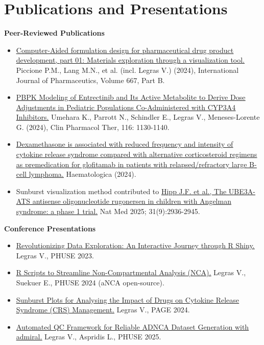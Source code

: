 \documentclass[10pt,a4paper]{article}
\newcommand{\link}[2]{\href{#1}{\textcolor{linkblue}{\uline{#2}}}}
\newcommand{\skillhead}[1]{\vspace{3pt}\noindent\textbf{\color{accent}#1}\par\vspace{1pt}}
\begin{document}
\section{Publications and Presentations}
{\sloppy
\skillhead{Peer-Reviewed Publications}
\begin{itemize}
  \item \link{https://www.sciencedirect.com/science/article/pii/S0378517324011256?via\%3Dihub}{Computer-Aided
        formulation design for pharmaceutical drug product development, part 01:
        Materials exploration through a visualization tool.} Piccione P.M.,
        Lang M.N., et al. (incl. Legras V.) (2024), International Journal of
        Pharmaceutics, Volume 667, Part B.
  \item \link{https://ascpt.onlinelibrary.wiley.com/doi/10.1002/cpt.3386}{PBPK
        Modeling of Entrectinib and Its Active Metabolite to Derive Dose
        Adjustments in Pediatric Populations Co-\allowbreak Administered with
        CYP3A4 Inhibitors.} Umehara K., Parrott N., Schindler E., Legras V.,
        Meneses-Lorente G. (2024), Clin Pharmacol Ther, 116: 1130-1140.
  \item \link{https://haematologica.org/article/view/11850}{Dexamethasone is
        associated with reduced frequency and intensity of cytokine release
        syndrome compared with alternative corticosteroid regimens as
        premedication for glofitamab in patients with relapsed/\allowbreak refractory
        large B-cell lymphoma.} Haematologica (2024).
  \item Sunburst visualization method contributed to \link{https://pubmed.ncbi.nlm.nih.gov/40646322/}{Hipp
        J.F. et al., The UBE3A-ATS antisense oligonucleotide rugonersen in
        children with Angelman syndrome: a phase 1 trial.} Nat Med 2025;
        31(9):2936-2945.
\end{itemize}
\vspace{3pt}
\skillhead{Conference Presentations}
\begin{itemize}
  \item \link{https://phuse.s3.eu-central-1.amazonaws.com/Archive/2023/Connect/EU/Birmingham/PRE_DV02.pdf}{Revolutionizing
        Data Exploration: An Interactive Journey through R Shiny.} Legras V.,
        PHUSE 2023.
  \item \link{https://phuse.s3.eu-central-1.amazonaws.com/Archive/2024/Connect/EU/Strasbourg/PRE_SM06.pdf}{R
        Scripts to Streamline Non-Compartmental Analysis (NCA).} Legras V.,
        Suekuer E., PHUSE 2024 (aNCA open-source).
  \item \link{https://www.page-meeting.org/wp-content/uploads/pdf_assets/11030-abstract.pdf}{Sunburst
        Plots for Analysing the Impact of Drugs on Cytokine Release Syndrome
        (CRS) Management.} Legras V., PAGE 2024.
  \item \link{https://phuse.s3.eu-central-1.amazonaws.com/Archive/2025/Connect/EU/Hamburg/PRE_SM05.pdf}{Automated
        QC Framework for Reliable ADNCA Dataset Generation with admiral.}
        Legras V., Aspridis L., PHUSE 2025.
\end{itemize}
\par}%
\end{document}
